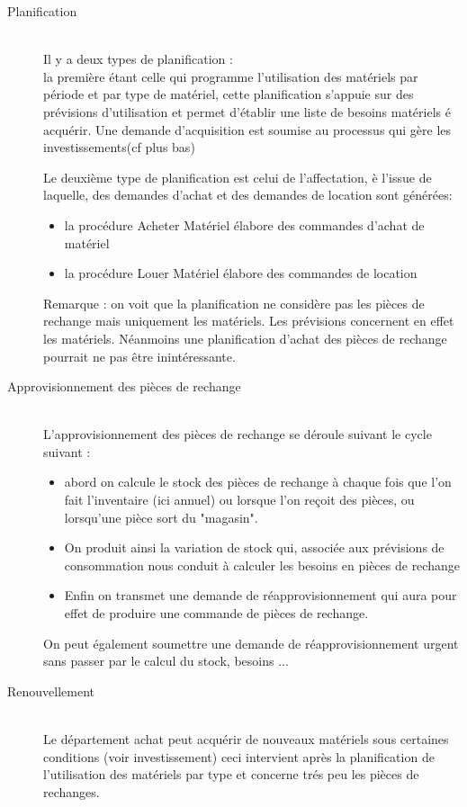 \begin{description}
      \item[Planification]~\\

Il y a deux types de planification : \\
la première étant celle qui programme l'utilisation des matériels par période et par type de matériel, cette planification s'appuie sur des prévisions d'utilisation et permet d'établir
une liste de besoins matériels é acquérir. Une demande d'acquisition est soumise au processus qui gère les investissements(cf plus bas)

Le deuxième type de planification est celui de l'affectation, è l'issue de laquelle, des demandes d'achat et des demandes de location sont générées:
\begin{itemize}
\item la procédure Acheter Matériel élabore des commandes d'achat de matériel
\item la procédure Louer Matériel élabore des commandes de location
\end{itemize}

Remarque : on voit que la planification ne considère pas les pièces de rechange mais uniquement les matériels. Les prévisions concernent en effet
les matériels. Néanmoins une planification d'achat des pièces de rechange pourrait ne pas être inintéressante.

    
    \item[Approvisionnement des pièces de rechange]~\\

L'approvisionnement des pièces de rechange se déroule suivant le cycle suivant :
\begin{itemize}
    \item abord on calcule le stock des pièces de rechange à chaque fois que l'on fait l'inventaire (ici annuel) ou lorsque l'on reçoit des pièces, ou lorsqu'une pièce sort du "magasin".
    \item On produit ainsi la variation de stock qui, associée aux prévisions de consommation nous conduit à calculer les besoins en pièces de rechange
    \item Enfin on transmet une demande de réapprovisionnement qui aura pour effet de produire une commande de pièces de rechange.
\end{itemize}

On peut également soumettre une demande de réapprovisionnement urgent sans passer par le calcul du stock, besoins ...

    \item[Renouvellement]~\\

Le département achat peut acquérir de nouveaux matériels sous certaines conditions (voir investissement)
ceci intervient après la planification de l'utilisation des matériels par type et concerne trés peu les pièces de rechanges.
\end{description}

